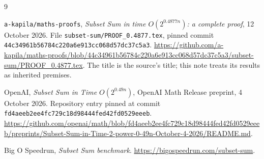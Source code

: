 \documentclass[11pt,a4paper]{article}
\theoremstyle{remark}
\begin{document}
\begin{thebibliography}{9}
\raggedright
{}
\texttt{a-kapila/maths-proofs},
\emph{Subset Sum in time $O(2^{0.4877n})$: a complete proof},
12 October 2026.
File \texttt{subset-sum/PROOF\_0.4877.tex}, pinned commit
\texttt{44c34961b56784c220a6e913cc068d57dc37c5a3}.
\url{https://github.com/a-kapila/maths-proofs/blob/44c34961b56784c220a6e913cc068d57dc37c5a3/subset-sum/PROOF_0.4877.tex}.
The title is the source's title; this note treats its results as
inherited premises.

OpenAI,
\emph{Subset Sum in Time $O(2^{0.49n})$},
OpenAI Math Release preprint, 4 October 2026.
Repository entry pinned at commit
\texttt{fd4aeeb2ee4fc729c18d98444fed42fd0529eeeb}.
\url{https://github.com/openai/math/blob/fd4aeeb2ee4fc729c18d98444fed42fd0529eeeb/preprints/Subset-Sum-in-Time-2-power-0-49n-October-4-2026/README.md}.

Big O Speedrun, \emph{Subset Sum benchmark}.
\url{https://bigospeedrun.com/subset-sum}.
\end{thebibliography}
\end{document}
